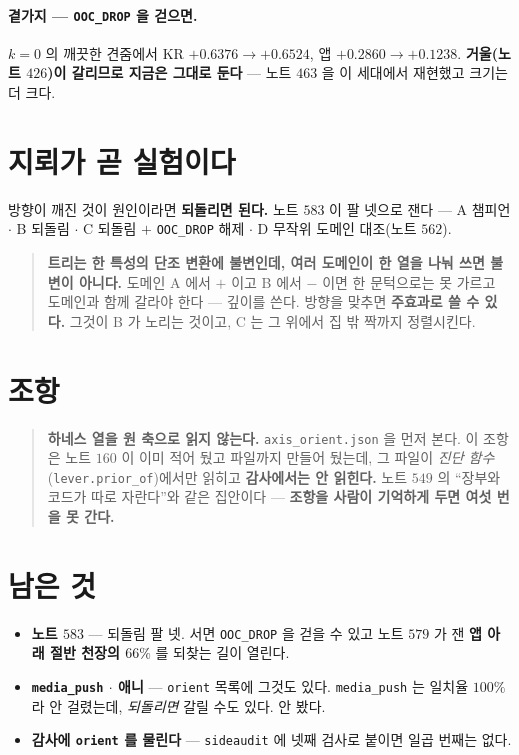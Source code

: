 \documentclass[11pt]{article}
\begin{document}
\paragraph{곁가지 --- \texttt{OOC\_DROP} 을 걷으면.}
$k{=}0$ 의 깨끗한 견줌에서 KR $+0.6376 \to \mathbf{+0.6524}$,
앱 $+0.2860 \to \mathbf{+0.1238}$. \textbf{거울(노트 $426$)이 갈리므로
지금은 그대로 둔다} --- 노트 $463$ 을 이 세대에서 재현했고 크기는 더 크다.

\section*{지뢰가 곧 실험이다}

방향이 깨진 것이 원인이라면 \textbf{되돌리면 된다.} 노트 $583$ 이 팔
넷으로 잰다 --- A 챔피언 $\cdot$ B 되돌림 $\cdot$ C 되돌림 $+$
\texttt{OOC\_DROP} 해제 $\cdot$ D 무작위 도메인 대조(노트 $562$).

\begin{quote}
\textbf{트리는 한 특성의 단조 변환에 불변인데, 여러 도메인이 한 열을
나눠 쓰면 불변이 아니다.} 도메인 A 에서 $+$ 이고 B 에서 $-$ 이면 한
문턱으로는 못 가르고 도메인과 함께 갈라야 한다 --- 깊이를 쓴다. 방향을
맞추면 \textbf{주효과로 쓸 수 있다.} 그것이 B 가 노리는 것이고, C 는
그 위에서 집 밖 짝까지 정렬시킨다.
\end{quote}

\section*{조항}

\begin{quote}
\textbf{하네스 열을 원 축으로 읽지 않는다.} \texttt{axis\_orient.json} 을
먼저 본다. 이 조항은 노트 $160$ 이 이미 적어 뒀고 파일까지 만들어 뒀는데,
그 파일이 \emph{진단 함수}(\texttt{lever.prior\_of})에서만 읽히고
\textbf{감사에서는 안 읽힌다.} 노트 $549$ 의 ``장부와 코드가 따로 자란다''와
같은 집안이다 --- \textbf{조항을 사람이 기억하게 두면 여섯 번을 못 간다.}
\end{quote}

\section*{남은 것}

\begin{itemize}
\item \textbf{노트 $583$} --- 되돌림 팔 넷. 서면 \texttt{OOC\_DROP} 을
걷을 수 있고 노트 $579$ 가 잰 \textbf{앱 아래 절반 천장의 $66\%$} 를
되찾는 길이 열린다.
\item \textbf{\texttt{media\_push} $\cdot$ 애니} --- \texttt{orient} 목록에
그것도 있다. \texttt{media\_push} 는 일치율 $100\%$ 라 안 걸렸는데,
\emph{되돌리면} 갈릴 수도 있다. 안 봤다.
\item \textbf{감사에 \texttt{orient} 를 물린다} --- \texttt{sideaudit} 에
넷째 검사로 붙이면 일곱 번째는 없다.
\end{itemize}
\end{document}
